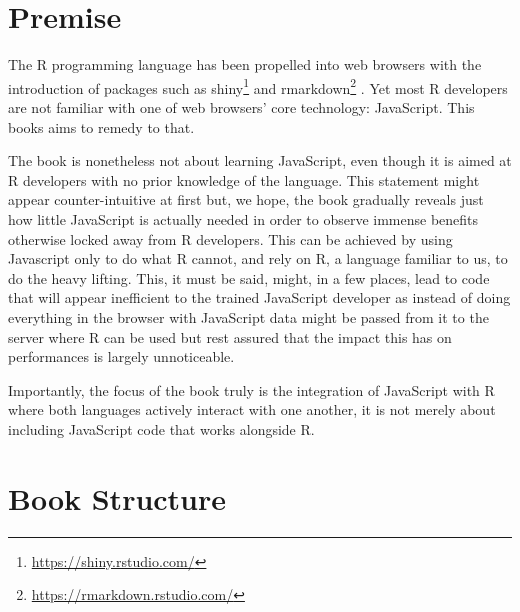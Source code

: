 \documentclass[
]{krantz}
\renewcommand{\href}[2]{#2\footnote{\url{#1}}}
\begin{document}
\hypertarget{premise}{%
\section*{Premise}\label{premise}}


The R programming language has been propelled into web browsers with the introduction of packages such as \href{https://shiny.rstudio.com/}{shiny} \citep{R-shiny} and \href{https://rmarkdown.rstudio.com/}{rmarkdown} \citep{R-rmarkdown}. Yet most R developers are not familiar with one of web browsers' core technology: JavaScript. This books aims to remedy to that.

The book is nonetheless not about learning JavaScript, even though it is aimed at R developers with no prior knowledge of the language. This statement might appear counter-intuitive at first but, we hope, the book gradually reveals just how little JavaScript is actually needed in order to observe immense benefits otherwise locked away from R developers. This can be achieved by using Javascript only to do what R cannot, and rely on R, a language familiar to us, to do the heavy lifting. This, it must be said, might, in a few places, lead to code that will appear inefficient to the trained JavaScript developer as instead of doing everything in the browser with JavaScript data might be passed from it to the server where R can be used but rest assured that the impact this has on performances is largely unnoticeable.

Importantly, the focus of the book truly is the integration of JavaScript with R where both languages actively interact with one another, it is not merely about including JavaScript code that works alongside R.

\hypertarget{book-structure}{%
\section*{Book Structure}\label{book-structure}}
\end{document}
